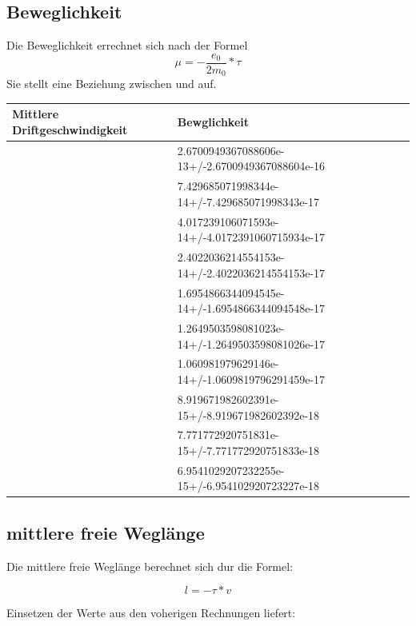 \documentclass[titlepage=firstcover, captions=tableheading]{scrartcl}
\begin{document}
\subsection{Beweglichkeit \mu}
Die Beweglichkeit \mu errechnet sich nach der Formel 
\begin{equation}
    \mu=-\frac{e_0}{2m_0}*\tau
\end{equation}
Sie stellt eine Beziehung zwischen \tau und \mu auf.
\begin{center}
    \begin{tabular}{ll}
        \toprule
        Mittlere Driftgeschwindigkeit & Bewglichkeit \\
        \midrule  
               & 2.6700949367088606e-13+/-2.6700949367088604e-16\\
               & 7.429685071998344e-14+/-7.429685071998343e-17\\
               & 4.017239106071593e-14+/-4.0172391060715934e-17\\
               & 2.4022036214554153e-14+/-2.4022036214554153e-17\\
               & 1.6954866344094545e-14+/-1.6954866344094548e-17\\
               & 1.2649503598081023e-14+/-1.2649503598081026e-17\\
               & 1.060981979629146e-14+/-1.0609819796291459e-17\\
               & 8.919671982602391e-15+/-8.919671982602392e-18   \\
               & 7.771772920751831e-15+/-7.771772920751833e-18 \\
               & 6.9541029207232255e-15+/-6.954102920723227e-18  \\
        \bottomrule
    \end{tabular}
\end{center}
\subsection{mittlere freie Weglänge}

Die mittlere freie Weglänge berechnet sich dur die Formel:

\begin{displaymath}
    l = -\tau * v
\end{displaymath}

Einsetzen der Werte aus den voherigen Rechnungen liefert:
\end{document}
